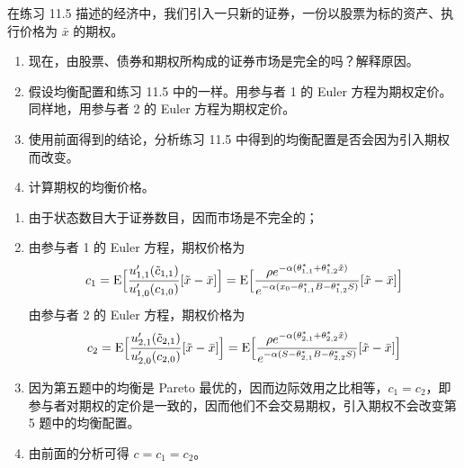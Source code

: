 \begin{problem}
 在练习 11.5 描述的经济中，我们引入一只新的证券，一份以股票为标的资产、执行价格为 $\bar{x}$ 的期权。
\begin{enumerate}[label=(\alph*)]
    \item 现在，由股票、债券和期权所构成的证券市场是完全的吗？解释原因。
    \item 假设均衡配置和练习 11.5 中的一样。用参与者 1 的 Euler 方程为期权定价。同样地，用参与者 2 的 Euler 方程为期权定价。
    \item 使用前面得到的结论，分析练习 11.5 中得到的均衡配置是否会因为引入期权而改变。
    \item 计算期权的均衡价格。
\end{enumerate}
\end{problem}
\begin{solution}
\begin{enumerate}[label=(\alph*)]
    \item 由于状态数目大于证券数目，因而市场是不完全的；
    \item 由参与者 1 的 Euler 方程，期权价格为
    \[
        c_{1}=\mathrm{E}\Bigl[\frac{u_{1,1}'(\tilde{c}_{1,1})}{u_{1,0}'(c_{1,0})}[\tilde{x}-\bar{x}]\Bigr]
        =\mathrm{E}\Bigl[\frac{\rho e^{-\alpha(\theta_{1,1}^{*}+\theta_{1,2}^{*}\tilde{x})}}{e^{-\alpha(x_{0}-\theta_{1,1}^{*}B-\theta_{1,2}^{*}S)}}[\tilde{x}-\bar{x}]\Bigr]
    \]
    由参与者 2 的 Euler 方程，期权价格为
    \[
        c_{2}=\mathrm{E}\Bigl[\frac{u_{2,1}'(\tilde{c}_{2,1})}{u_{2,0}'(c_{2,0})}[\tilde{x}-\bar{x}]\Bigr]
        =\mathrm{E}\Bigl[\frac{\rho e^{-\alpha(\theta_{2,1}^{*}+\theta_{2,2}^{*}\tilde{x})}}{e^{-\alpha(S-\theta_{2,1}^{*}B-\theta_{2,2}^{*}S)}}[\tilde{x}-\bar{x}]\Bigr]
    \]
    \item 因为第五题中的均衡是 Pareto 最优的，因而边际效用之比相等，$c_{1}=c_{2}$，即参与者对期权的定价是一致的，因而他们不会交易期权，引入期权不会改变第 5 题中的均衡配置。
    \item 由前面的分析可得 $c=c_{1}=c_{2}$。
\end{enumerate}
\end{solution}


